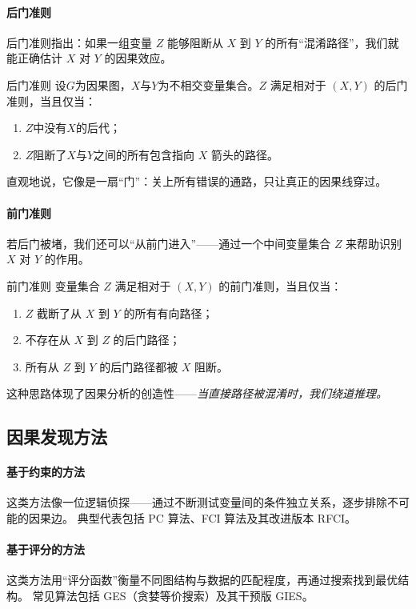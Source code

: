\paragraph{后门准则}
后门准则指出：如果一组变量 $Z$ 能够阻断从 $X$ 到 $Y$ 的所有“混淆路径”，我们就能正确估计 $X$ 对 $Y$ 的因果效应。  
\begin{definition}[]{后门准则}
设$G$为因果图，$X$与$Y$为不相交变量集合。$Z$ 满足相对于 $(X,Y)$ 的后门准则，当且仅当：
\begin{enumerate}
\item $Z$中没有$X$的后代；
\item $Z$阻断了$X$与$Y$之间的所有包含指向 $X$ 箭头的路径。
\end{enumerate}
\end{definition}
直观地说，它像是一扇“门”：关上所有错误的通路，只让真正的因果线穿过。

\paragraph{前门准则}
若后门被堵，我们还可以“从前门进入”——通过一个中间变量集合 $Z$ 来帮助识别 $X$ 对 $Y$ 的作用。  
\begin{definition}[]{前门准则}
变量集合 $Z$ 满足相对于 $(X,Y)$ 的前门准则，当且仅当：
\begin{enumerate}
\item $Z$ 截断了从 $X$ 到 $Y$ 的所有有向路径；
\item 不存在从 $X$ 到 $Z$ 的后门路径；
\item 所有从 $Z$ 到 $Y$ 的后门路径都被 $X$ 阻断。
\end{enumerate}
\end{definition}
这种思路体现了因果分析的创造性——\emph{当直接路径被混淆时，我们绕道推理。}

\subsection{因果发现方法}

\paragraph{基于约束的方法}
这类方法像一位逻辑侦探——通过不断测试变量间的条件独立关系，逐步排除不可能的因果边。  
典型代表包括 PC 算法、FCI 算法及其改进版本 RFCI。

\paragraph{基于评分的方法}
这类方法用“评分函数”衡量不同图结构与数据的匹配程度，再通过搜索找到最优结构。  
常见算法包括 GES（贪婪等价搜索）及其干预版 GIES。

